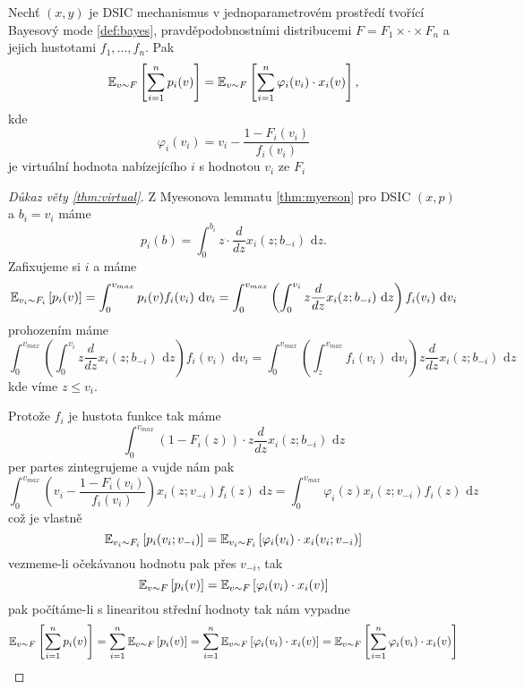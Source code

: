 \begin{theorem}\label{thm:virtual}
    Nechť $(x,y)$ je DSIC mechanismus v jednoparametrovém prostředí tvořící Bayesový mode \ref{def:bayes}, pravděpodobnostními distribucemi $F = F_1\times \cdot \times F_n$ a jejich hustotami $f_1, \dots,f_n$. 
    Pak 
    \[
        \E[v\sim F]{\sum^n_{i=1} p_i(v)} = \E[v\sim F]{\sum^n_{i=1} \varphi_i(v_i) \cdot x_i(v)},  
    \]
    kde  
    \[
        \varphi_i(v_i) = v_i - \frac{1-F_i(v_i)}{f_i(v_i)}
    \]
    je virtuální hodnota nabízejícího $i$ s hodnotou $v_i$ ze $F_i$
\end{theorem}
\begin{proof}[Důkaz věty \ref{thm:virtual}]
    Z Myesonova lemmatu \ref{thm:myerson} pro DSIC $(x,p)$ a $b_i = v_i$ máme 
    \[
        p_i(b) = \int^{b_i}_0 z \cdot \frac{d}{dz} x_i(z;b_{-i}) \text{ d}z. 
    \]
    Zafixujeme si $i$ a máme 
    \[
        \E[v_i\sim F_i]{p_i(v)} = \int^{v_{max}}_0 p_i(v)f_i(v_i) \text{ d}v_i = \int^{v_{max}}_0 \left( \int_0^{v_i} z \frac{d}{dz} x_i(z;b_{-i}) \text{ d}z \right)f_i(v_i) \text{ d}v_i
    \]
    prohozením máme 
    \[
    \int^{v_{max}}_0 \left( \int_0^{v_i} z \frac{d}{dz} x_i(z;b_{-i}) \text{ d}z \right)f_i(v_i) \text{ d}v_i = \int^{v_{max}}_0 \left( \int_z^{v_{max}} f_i(v_i) \text{ d}v_i \right) z \frac{d}{dz} x_i(z;b_{-i}) \text{ d}z
    \]
    kde víme $z \leq v_i$. 

    Protože $f_i$ je hustota funkce tak máme 
    \[
         \int^{v_{max}}_0 \left( 1- F_i(z) \right) \cdot z \frac{d}{dz} x_i(z;b_{-i}) \text{ d}z
    \]
    per partes zintegrujeme a vujde nám pak 
    \[
        \int_0^{v_{max}} \left( v_i - \frac{1-F_i(v_i)}{f_i(v_i)} \right) x_i(z;v_{-i})f_i(z) \text{ d}z = \int_0^{v_{max}} \varphi_i(z) x_i(z;v_{-i})f_i(z) \text{ d}z
    \]
    což je vlastně 
    \[
        \E[v_i \sim F_i]{p_i(v_i;v_{-i})} = \E[v_i \sim F_i]{\varphi_i(v_i) \cdot x_i(v_i;v_{-i})}
    \] 
    vezmeme-li očekávanou hodnotu pak přes $v_{-i}$, tak 
    \[
        \E[v \sim F]{p_i(v)} = \E[v \sim F]{ \varphi_i(v_i) \cdot x_i(v)}
    \]
    pak počítáme-li s linearitou střední hodnoty tak nám vypadne 
    \[
        \E[v \sim F]{\sum^n_{i=1}p_i(v)} = \sum^n_{i=1} \E[v \sim F]{p_i(v)} = \sum^n_{i=1} \E[v \sim F]{\varphi_i(v_i) \cdot x_i(v)} = \E[v \sim F]{\sum^n_{i=1} \varphi_i(v_i) \cdot x_i(v)}
    \]
\end{proof}

